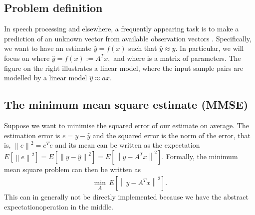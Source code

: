 \documentclass[letterpaper,10pt,english]{jupyterBook}
\begin{document}
\subsection{Problem definition}
\label{\detokenize{Modelling/Linear_regression:problem-definition}}
\sphinxAtStartPar
In speech processing and elsewhere, a frequently appearing task is to
make a prediction of an unknown vector  from available observation
vectors . Specifically, we want to have an estimate \( \hat y =
f(x) \) such that \( \hat y \approx y. \) In particular, we will
focus on  where \( \hat y=f(x):=A^T x, \) and where
 is a matrix of parameters. The figure on the right illustrates a
linear model, where the input sample pairs  are modelled by a
linear model  \( \hat y \approx ax. \)

\sphinxAtStartPar
{}


\subsection{The minimum mean square estimate (MMSE)}
\label{\detokenize{Modelling/Linear_regression:the-minimum-mean-square-estimate-mmse}}
\sphinxAtStartPar
Suppose we want to minimise the squared error of our estimate on
average. The estimation error is \( e=y-\hat y \) and the squared
error is the \sphinxhyphen{}norm of the error, that is, \(
\left\|e\right\|^2 = e^T e \) and its mean can be written as the
expectation \( E\left[\left\|e\right\|^2\right] =
E\left[\left\|y-\hat y\right\|^2\right] =
E\left[\left\|y-A^T x\right\|^2\right]. \) Formally, the
minimum mean square problem can then be written as
\begin{equation*}
\begin{split} \min_A\, E\left[\left\|y-A^T x\right\|^2\right]. \end{split}
\end{equation*}
\sphinxAtStartPar
This can in generally not be directly implemented because we have the
abstract expectation\sphinxhyphen{}operation in the middle.
\end{document}
